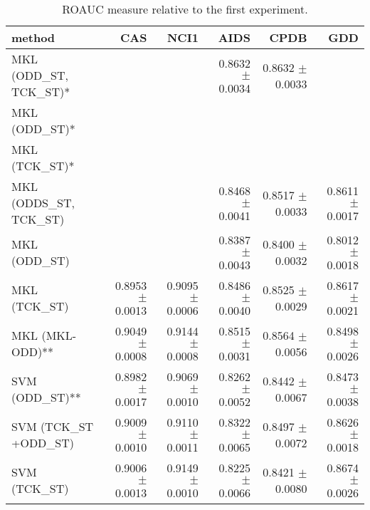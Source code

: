 \begin{landscape}
    \begin{table}[ht]
        \centering
        \begin{tabular}{|l|r|r|r|r|r|}
            \hline
            method&CAS&NCI1&AIDS&CPDB&GDD\\
            \hline
            MKL (ODD\_ST, TCK\_ST)* &&&0.8632 $\pm$ 0.0034&0.8632 $\pm$ 0.0033&\\
            \hline
            MKL (ODD\_ST)*&&&&&\\
            \hline
            MKL (TCK\_ST)*&&&&&\\
            \hline
            MKL (ODDS\_ST, TCK\_ST)&&&0.8468 $\pm$ 0.0041&0.8517 $\pm$ 0.0033&0.8611 $\pm$ 0.0017\\
            \hline
            MKL (ODD\_ST)&&&0.8387 $\pm$ 0.0043&0.8400 $\pm$ 0.0032&0.8012$\pm$ 0.0018\\
            \hline
            MKL (TCK\_ST)&0.8953 $\pm$ 0.0013&0.9095 $\pm$ 0.0006&0.8486 $\pm$ 0.0040&0.8525 $\pm$ 0.0029&0.8617 $\pm$ 0.0021\\
            \hline
            MKL (MKL-ODD)** &0.9049 $\pm$ 0.0008&0.9144 $\pm$ 0.0008&0.8515 $\pm$ 0.0031&0.8564 $\pm$ 0.0056&0.8498 $\pm$ 0.0026\\
            \hline
            SVM (ODD\_ST)** &0.8982 $\pm$ 0.0017&0.9069 $\pm$ 0.0010&0.8262 $\pm$ 0.0052&0.8442 $\pm$ 0.0067&0.8473 $\pm$ 0.0038\\
            \hline
            SVM (TCK\_ST +ODD\_ST)&0.9009 $\pm$ 0.0010&0.9110 $\pm$ 0.0011&0.8322 $\pm$ 0.0065&0.8497 $\pm$ 0.0072&0.8626 $\pm$ 0.0018\\
            \hline
            SVM (TCK\_ST)&0.9006 $\pm$ 0.0013&0.9149 $\pm$ 0.0010&0.8225 $\pm$ 0.0066&0.8421 $\pm$ 0.0080&0.8674 $\pm$ 0.0026\\
            \hline
        \end{tabular}
        \label{table:results_st}
        \caption{ROAUC measure relative to the first experiment. }


\end{table}
\end{landscape}
